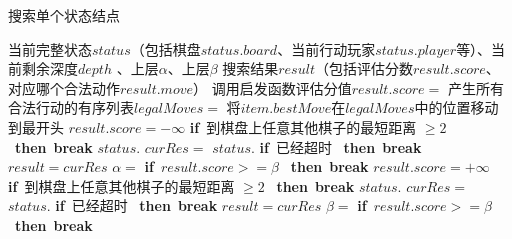 \documentclass{acm_proc_article-sp}
\begin{document}
\begin{algorithm}
    \algsetup{\tiny}
    \scriptsize
    \caption{搜索单个状态结点}
    \begin{algorithmic}[1] %
        \Require 当前完整状态$status$（包括棋盘$status.board$、当前行动玩家$status.player$等）、当前剩余深度$depth$
        、上层$\alpha$、上层$\beta$
        \Ensure 搜索结果$result$（包括评估分数$result.score$、对应哪个合法动作$result.move$）
        \State 调用启发函数评估分值$result.score = $
        \State {}
        \EndIf
        \State 产生所有合法行动的有序列表$legalMoves = $
        \State {}
        \Else
        \State 将$item.bestMove$在$legalMoves$中的位置移动到最开头
        \EndIf
        \EndIf
        \State $result.score = -\infty$
        \State \textbf{if}\ 到棋盘上任意其他棋子的最短距离 $\ge2$ \ \textbf{then}\ \textbf{break}
        \State $status.$
        \State $curRes = $ 
        \State $status.$
        \State \textbf{if}\ {已经超时} \ \textbf{then}\ \textbf{break}
        \State $result = curRes$
        \State $\alpha = $ 
        \EndIf
        \State \textbf{if}\ {$result.score >= \beta$} \ \textbf{then}\ \textbf{break}
        \EndFor
        \EndIf
        \State $result.score = +\infty$
        \State \textbf{if}\ 到棋盘上任意其他棋子的最短距离 $\ge2$ \ \textbf{then}\ \textbf{break}
        \State $status.$
        \State $curRes = $ 
        \State $status.$
        \State \textbf{if}\ {已经超时} \ \textbf{then}\ \textbf{break}
        \State $result = curRes$
        \State $\beta = $ 
        \EndIf
        \State \textbf{if}\ {$result.score >= \beta$} \ \textbf{then}\ \textbf{break}
        \EndFor
        \EndIf
        \State {}
        \EndFunction
    \end{algorithmic}
\end{algorithm}
\end{document}
